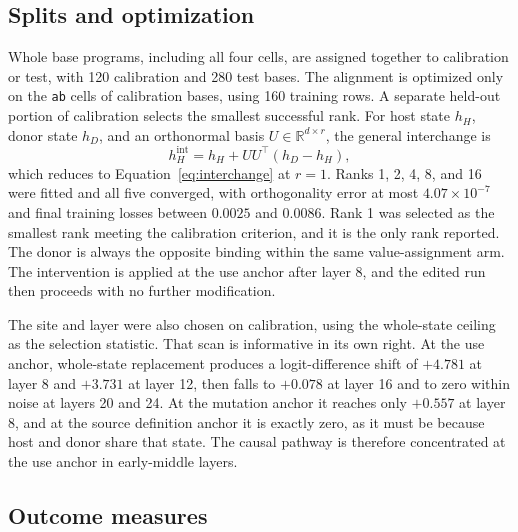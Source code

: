 \documentclass{article}
\begin{document}
\subsection{Splits and optimization}

Whole base programs, including all four cells, are assigned together to calibration or test, with 120 calibration and 280 test bases. The alignment is optimized only on the \texttt{ab} cells of calibration bases, using 160 training rows. A separate held-out portion of calibration selects the smallest successful rank. For host state $h_H$, donor state $h_D$, and an orthonormal basis $U\in\mathbb{R}^{d\times r}$, the general interchange is
\begin{equation}
 h_H^{\mathrm{int}}=h_H+UU^{\top}(h_D-h_H),
 \label{eq:interchange-general}
\end{equation}
which reduces to Equation~\ref{eq:interchange} at $r=1$. Ranks 1, 2, 4, 8, and 16 were fitted and all five converged, with orthogonality error at most $4.07\times10^{-7}$ and final training losses between $0.0025$ and $0.0086$. Rank 1 was selected as the smallest rank meeting the calibration criterion, and it is the only rank reported. The donor is always the opposite binding within the same value-assignment arm. The intervention is applied at the use anchor after layer 8, and the edited run then proceeds with no further modification.

The site and layer were also chosen on calibration, using the whole-state ceiling as the selection statistic. That scan is informative in its own right. At the use anchor, whole-state replacement produces a logit-difference shift of $+4.781$ at layer 8 and $+3.731$ at layer 12, then falls to $+0.078$ at layer 16 and to zero within noise at layers 20 and 24. At the mutation anchor it reaches only $+0.557$ at layer 8, and at the source definition anchor it is exactly zero, as it must be because host and donor share that state. The causal pathway is therefore concentrated at the use anchor in early-middle layers.

\subsection{Outcome measures}
\end{document}
